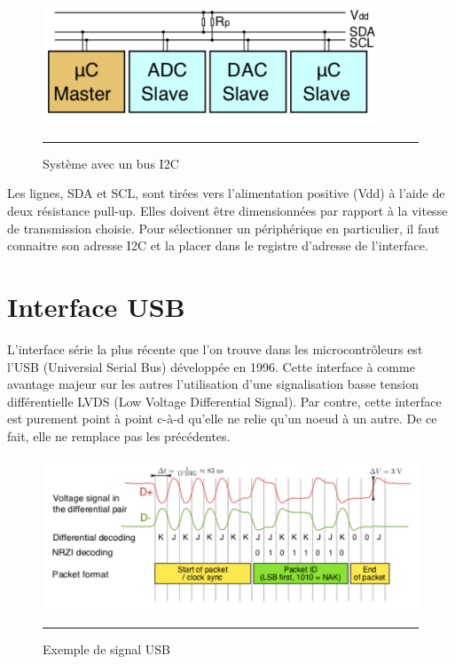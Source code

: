 \begin{figure}[htb]
  \centering
  \includegraphics[width=10cm]{./Figures/serial/I2C.pdf}
  \rule{35em}{0.5pt}
  \caption[i2c]{Système avec un bus I2C}
  \label{fig:i2c}
\end{figure}

Les lignes, SDA et SCL, sont tirées vers l'alimentation positive (Vdd) à l'aide de deux résistance pull-up. Elles doivent être dimensionnées par rapport à la vitesse de transmission choisie. Pour sélectionner un périphérique en particulier, il faut connaitre son adresse I2C et la placer dans le registre d'adresse de l'interface.

\section{Interface USB}

L'interface série la plus récente que l'on trouve dans les microcontrôleurs est l'USB (Universial Serial Bus) développée en 1996. Cette interface à comme avantage majeur sur les autres l'utilisation d'une signalisation basse tension différentielle LVDS (Low Voltage Differential Signal). Par contre, cette interface est purement point à point c-à-d qu'elle ne relie qu'un noeud à un autre. De ce fait, elle ne remplace pas les précédentes.

\begin{figure}[htb]
  \centering
  \includegraphics[width=14cm]{./Figures/serial/USB_signal_example.pdf}
  \rule{35em}{0.5pt}
  \caption[usb]{Exemple de signal USB}
  \label{fig:usb}
\end{figure}

